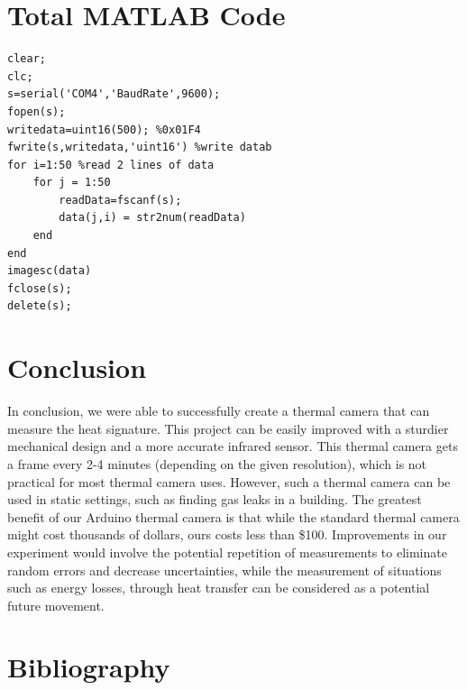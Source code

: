 \documentclass[11pt]{article}
\begin{document}
\section{Total MATLAB Code}
\begin{lstlisting}
clear;
clc;
s=serial('COM4','BaudRate',9600);
fopen(s);
writedata=uint16(500); %0x01F4
fwrite(s,writedata,'uint16') %write datab
for i=1:50 %read 2 lines of data
    for j = 1:50
        readData=fscanf(s);
        data(j,i) = str2num(readData)
    end
end
imagesc(data)
fclose(s);
delete(s);
\end{lstlisting}
\newpage
\section{Conclusion}
In conclusion, we were able to successfully create a thermal camera that can measure the heat signature. This project can be easily improved with a sturdier mechanical design and a more accurate infrared sensor. This thermal camera gets a frame every 2-4 minutes (depending on the given resolution), which is not practical for most thermal camera uses. However, such a thermal camera can be used in static settings, such as finding gas leaks in a building. The greatest benefit of our Arduino thermal camera is that while the standard thermal camera might cost thousands of dollars, ours costs less than \$100. Improvements in our experiment would involve the potential repetition of measurements to eliminate random errors and decrease uncertainties, while the measurement of situations such as energy losses, through heat transfer can be considered as a potential future movement.

\newpage
\section{Bibliography}
\end{document}
